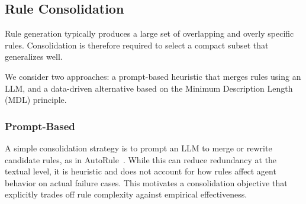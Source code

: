 \subsection{Rule Consolidation}
\label{sec:consolidate}

Rule generation typically produces a large set of overlapping and overly specific rules.
Consolidation is therefore required to select a compact subset that generalizes well.


We consider two approaches: a prompt-based heuristic that merges rules using an LLM, and a data-driven alternative based on the Minimum Description Length (MDL) principle.


\subsubsection{Prompt-Based}

A simple consolidation strategy is to prompt an LLM to merge or rewrite candidate rules,
as in AutoRule~\citep{wang2025autorule}. While this can reduce redundancy at the textual
level, it is heuristic and does not account for how rules affect agent behavior on actual
failure cases. This motivates a consolidation objective that explicitly trades off rule
complexity against empirical effectiveness.


